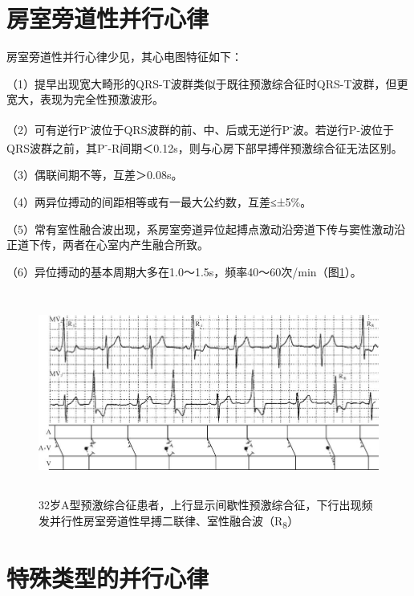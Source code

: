 \protect\hypertarget{text00023.htmlux5cux23subid288}{}{}

\section{房室旁道性并行心律}

房室旁道性并行心律少见，其心电图特征如下：

（1）提早出现宽大畸形的QRS-T波群类似于既往预激综合征时QRS-T波群，但更宽大，表现为完全性预激波形。

（2）可有逆行P\textsuperscript{-}波位于QRS波群的前、中、后或无逆行P\textsuperscript{-}波。若逆行P-波位于QRS波群之前，其P\textsuperscript{-}-R间期＜0.12s，则与心房下部早搏伴预激综合征无法区别。

（3）偶联间期不等，互差＞0.08s。

（4）两异位搏动的间距相等或有一最大公约数，互差≤±5\%。

（5）常有室性融合波出现，系房室旁道异位起搏点激动沿旁道下传与窦性激动沿正道下传，两者在心室内产生融合所致。

（6）异位搏动的基本周期大多在1.0～1.5s，频率40～60次/min（图\ref{fig16-13}）。

\begin{figure}[!htbp]
 \centering
 \includegraphics[width=5.78125in,height=2.625in]{./images/Image00289.jpg}
 \captionsetup{justification=centering}
 \caption{32岁A型预激综合征患者，上行显示间歇性预激综合征，下行出现频发并行性房室旁道性早搏二联律、室性融合波（R\textsubscript{8}）}
 \label{fig16-13}
  \end{figure} 


\protect\hypertarget{text00023.htmlux5cux23subid289}{}{}

\section{特殊类型的并行心律}


